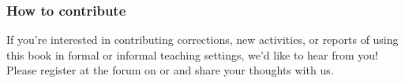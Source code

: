 \subsubsection{How to contribute}
If you're interested in contributing corrections, new activities, or reports of using this book in formal or informal teaching settings, we'd like to hear from you! 
Please register at the forum on  or  and share your thoughts with us.

%
%



